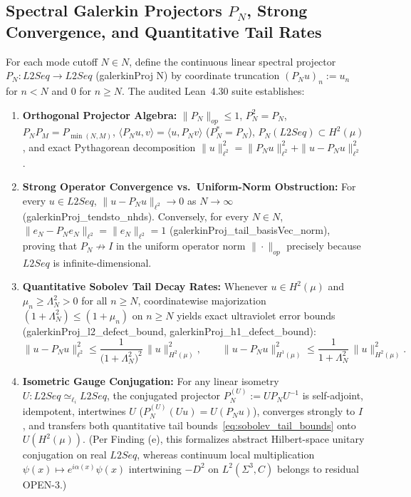 \documentclass[american,11pt,letterpaper]{article}
\def\mathbb#1{#1}%
\def\mathbf#1{#1}%
\def\mathrm#1{#1}%
\def\texttt#1{#1}%
\begin{document}
\subsection{Spectral Galerkin Projectors $P_N$, Strong Convergence, and Quantitative Tail Rates}

For each mode cutoff $N \in \mathbb{N}$, define the continuous linear spectral projector $P_N : \mathrm{L2Seq} \to \mathrm{L2Seq}$ (\texttt{galerkinProj N}) by coordinate truncation $(P_N u)_n := u_n$ for $n < N$ and $0$ for $n \ge N$. The audited Lean~4.30 suite establishes:
\begin{enumerate}[leftmargin=2em]
  \item \textbf{Orthogonal Projector Algebra:} $\|P_N\|_{\mathrm{op}} \le 1$, $P_N^2 = P_N$, $P_N P_M = P_{\min(N,M)}$, $\langle P_N u, v\rangle = \langle u, P_N v\rangle$ ($P_N^* = P_N$), $P_N(\mathrm{L2Seq}) \subset H^2(\mu)$, and exact Pythagorean decomposition $\|u\|_{\ell^2}^2 = \|P_N u\|_{\ell^2}^2 + \|u - P_N u\|_{\ell^2}^2$.
  \item \textbf{Strong Operator Convergence vs.\ Uniform-Norm Obstruction:} For every $u \in \mathrm{L2Seq}$, $\|u - P_N u\|_{\ell^2} \to 0$ as $N \to \infty$ (\texttt{galerkin\allowbreak{}Proj\_\allowbreak{}tendsto\_\allowbreak{}nhds}). Conversely, for every $N \in \mathbb{N}$, $\|e_N - P_N e_N\|_{\ell^2} = \|e_N\|_{\ell^2} = 1$ (\texttt{galerkin\allowbreak{}Proj\_\allowbreak{}tail\_\allowbreak{}basis\allowbreak{}Vec\_\allowbreak{}norm}), proving that $P_N \not\to I$ in the uniform operator norm $\|\cdot\|_{\mathrm{op}}$ precisely because $\mathrm{L2Seq}$ is infinite-dimensional.
  \item \textbf{Quantitative Sobolev Tail Decay Rates:} Whenever $u \in H^2(\mu)$ and $\mu_n \ge \Lambda_N^2 > 0$ for all $n \ge N$, coordinatewise majorization $(1 + \Lambda_N^2) \le (1 + \mu_n)$ on $n \ge N$ yields exact ultraviolet error bounds (\texttt{galerkin\allowbreak{}Proj\_\allowbreak{}l2\_\allowbreak{}defect\_\allowbreak{}bound}, \texttt{galerkin\allowbreak{}Proj\_\allowbreak{}h1\_\allowbreak{}defect\_\allowbreak{}bound}):
  \begin{equation}
  \|u - P_N u\|_{\ell^2}^2 \le \frac{1}{\bigl(1 + \Lambda_N^2\bigr)^2}\,\|u\|_{H^2(\mu)}^2,
  \qquad
  \|u - P_N u\|_{H^1(\mu)}^2 \le \frac{1}{1 + \Lambda_N^2}\,\|u\|_{H^2(\mu)}^2.
  \label{eq:sobolev_tail_bounds}
  \end{equation}
  \item \textbf{Isometric Gauge Conjugation:} For any linear isometry $U : \mathrm{L2Seq} \simeq_{\ell_i} \mathrm{L2Seq}$, the conjugated projector $P_N^{(U)} := U P_N U^{-1}$ is self-adjoint, idempotent, intertwines $U$ ($P_N^{(U)}(Uu) = U(P_N u)$), converges strongly to $I$, and transfers both quantitative tail bounds~\eqref{eq:sobolev_tail_bounds} onto $U(H^2(\mu))$. (Per \texttt{Finding (e)}, this formalizes abstract Hilbert-space unitary conjugation on real $\mathrm{L2Seq}$, whereas continuum local multiplication $\psi(x) \mapsto e^{i\alpha(x)}\psi(x)$ intertwining $-\mathbf{D}^2$ on $L^2(\Sigma^3,\mathbb{C})$ belongs to residual \texttt{OPEN-3}.)
\end{enumerate}
\end{document}
